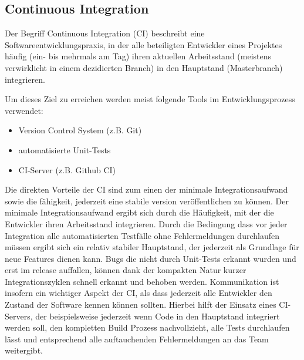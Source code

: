 \subsection{Continuous Integration}
Der Begriff Continuous Integration (CI) beschreibt eine Softwareentwicklungspraxis,
in der alle beteiligten Entwickler eines Projektes häufig (ein- bis mehrmals am Tag) ihren aktuellen
Arbeitsstand (meistens verwirklicht in einem dezidierten Branch) in den Hauptstand
(Masterbranch) integrieren.

Um dieses Ziel zu erreichen werden meist folgende Tools im Entwicklungsprozess 
verwendet:

\begin{itemize}
	\item Version Control System (z.B. Git)
	\item automatisierte Unit-Tests
	\item CI-Server (z.B. Github CI)
\end{itemize}

Die direkten Vorteile der CI sind zum einen der minimale Integrationsaufwand sowie die fähigkeit, 
jederzeit eine stabile version veröffentlichen zu können.
Der minimale Integrationsaufwand ergibt sich durch die Häufigkeit,
mit der die Entwickler ihren Arbeitsstand integrieren. Durch die
Bedingung dass vor jeder Integration alle automatisierten Testfälle ohne Fehlermeldungen durchlaufen
müssen ergibt sich ein relativ stabiler Hauptstand, der jederzeit als Grundlage für neue Features dienen kann.
Bugs die nicht durch Unit-Tests erkannt wurden und erst im release auffallen, können dank der kompakten Natur kurzer
Integrationszyklen schnell erkannt und behoben werden.
Kommunikation ist insofern ein wichtiger Aspekt der CI, als dass jederzeit alle Entwickler den Zustand der Software
kennen können sollten. Hierbei hilft der Einsatz eines CI-Servers, der beispielsweise jederzeit wenn Code in den Hauptstand
integriert werden soll, den kompletten Build Prozess nachvollzieht, alle Tests durchlaufen lässt und entsprechend alle
auftauchenden Fehlermeldungen an das Team weitergibt.
\cite{ciwiki}